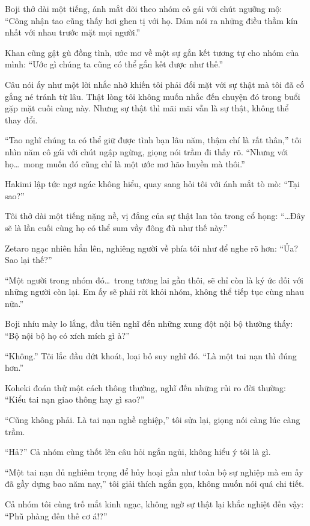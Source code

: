 \documentclass[../main.tex]{subfiles}
\begin{document}
Boji thở dài một tiếng, ánh mắt dõi theo nhóm cô gái với chút ngưỡng mộ: ``Công nhận tao cũng thấy hơi ghen tị với họ. Dám nói ra những điều thầm kín nhất với nhau trước mặt mọi người.''

Khan cũng gật gù đồng tình, ước mơ về một sự gắn kết tương tự cho nhóm của mình: ``Ước gì chúng ta cũng có thể gắn kết được như thế.''

Câu nói ấy như một lời nhắc nhở khiến tôi phải đối mặt với sự thật mà tôi đã cố gắng né tránh từ lâu. Thật lòng tôi không muốn nhắc đến chuyện đó trong buổi gặp mặt cuối cùng này. Nhưng sự thật thì mãi mãi vẫn là sự thật, không thể thay đổi.

``Tao nghĩ chúng ta có thể giữ được tình bạn lâu năm, thậm chí là rất thân,'' tôi nhìn năm cô gái với chút ngập ngừng, giọng nói trầm đi thấy rõ. ``Nhưng với họ\dots\ mong muốn đó cũng chỉ là một ước mơ hão huyền mà thôi.''

Hakimi lập tức ngơ ngác không hiểu, quay sang hỏi tôi với ánh mắt tò mò: ``Tại sao?''

Tôi thở dài một tiếng nặng nề, vị đắng của sự thật lan tỏa trong cổ họng: ``\dots Đây sẽ là lần cuối cùng họ có thể sum vầy đông đủ như thế này.''

Zetaro ngạc nhiên hẳn lên, nghiêng người về phía tôi như để nghe rõ hơn: ``Ủa? Sao lại thế?''

``Một người trong nhóm đó\dots\ trong tương lai gần thôi, sẽ chỉ còn là ký ức đối với những người còn lại. Em ấy sẽ phải rời khỏi nhóm, không thể tiếp tục cùng nhau nữa.''

Boji nhíu mày lo lắng, đầu tiên nghĩ đến những xung đột nội bộ thường thấy: ``Bộ nội bộ họ có xích mích gì à?''

``Không.'' Tôi lắc đầu dứt khoát, loại bỏ suy nghĩ đó. ``Là một tai nạn thì đúng hơn.''

Koheki đoán thử một cách thông thường, nghĩ đến những rủi ro đời thường: ``Kiểu tai nạn giao thông hay gì sao?''

``Cũng không phải. Là tai nạn nghề nghiệp,'' tôi sửa lại, giọng nói càng lúc càng trầm.

``Hả?'' Cả nhóm cùng thốt lên câu hỏi ngắn ngủi, không hiểu ý tôi là gì.

``Một tai nạn đủ nghiêm trọng để hủy hoại gần như toàn bộ sự nghiệp mà em ấy đã gầy dựng bao năm nay,'' tôi giải thích ngắn gọn, không muốn nói quá chi tiết.

Cả nhóm tôi cùng trố mắt kinh ngạc, không ngờ sự thật lại khắc nghiệt đến vậy: ``Phũ phàng đến thế cơ á!?''
\end{document}
